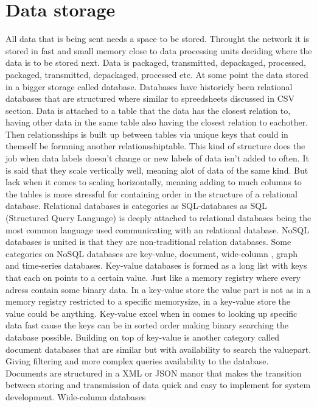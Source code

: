 \documentclass[article,a4paper]{IEEEtran}
\begin{document}
\section{Data storage}
All data that is being sent needs a space to be stored. Throught the network it is stored in fast and small memory close to data processing units deciding where the data is to be stored next. Data is packaged, transmitted, depackaged, processed, packaged, transmitted, depackaged, processed etc. At some point the data stored in a bigger storage called database. Databases have historicly been relational databases that are structured where similar to spreedsheets discussed in CSV section. Data is attached to a table that the data has the closest relation to, having other data in the same table also having the closest relation to eachother. 
\newline 
Then relationsships is built up between tables via unique keys that could in themself be formning another relationsshiptable. This kind of structure does the job when data labels doesn't change or new labels of data isn't added to often. It is said that they scale vertically well, meaning alot of data of the same kind. But lack when it comes to scaling horizontally, meaning adding to much columns to the tables is more stressful for containing order in the structure of a relational database. Relational databases is categories as SQL-databases as SQL (Structured Query Language) is deeply attached to relational databases being the most common language used communicating with an relational database. NoSQL databases is united is that they are non-traditional relation databases. Some categories on NoSQL databases are key-value, document, wide-column \cite{Databasesurvey}, graph and time-series databases.      
\newline\newline
Key-value databases is formed as a long list with keys that each on points to a certain value. Just like a memory registry where every adress contain some binary data. In a key-value store the value part is not as in a memory registry restricted to a specific memorysize, in a key-value store the value could be anything. Key-value excel when in comes to looking up specific data fast cause the keys can be in sorted order making binary searching the database possible. 
\newline\newline
Building on top of key-value is another category called document databases that are similar but with availability to search the valuepart. Giving filtering and more complex queries availability to the database. Documents are structured in a XML or JSON manor that makes the transition between storing and transmission of data quick and easy to implement for system development. 
\newline\newline
Wide-column databases  
\printbibliography
\end{document}
